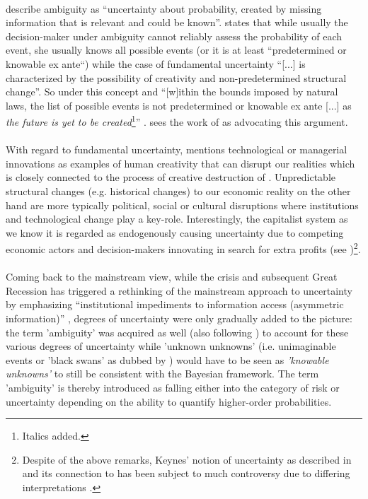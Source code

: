 \documentclass[a4paper,12pt,oneside,pointednumbers,bibtotoc,bigheadings,liststotoc]{scrbook}
\begin{document}
\\
\citet[p. 330]{camererandweber:92} describe ambiguity as ``uncertainty about probability, created by missing information that is relevant and could be known''. \citet[p. 623]{dequech:14} states that while usually the decision-maker under ambiguity cannot reliably assess the probability of each event, she usually knows all possible events (or it is at least ``predetermined or knowable ex ante``) while the case of fundamental uncertainty ``[...] is characterized by the possibility of creativity and non-predetermined structural change''. So under this concept and ``[w]ithin the bounds imposed by natural laws, the list of possible events is not predetermined or knowable ex ante [...] as \textit{the future is yet to be created}\footnote{Italics added.}'' \citep[p. 623]{dequech:14}. \citet{dequesh:00} sees the work of \citet{shackle:72} as advocating this argument.\\
\\
With regard to fundamental uncertainty, \citet{dequesh:00} mentions technological or managerial innovations as examples of human creativity that can disrupt our realities which is closely connected to the process of creative destruction of \citet{schumpeter:42}. Unpredictable structural changes (e.g. historical changes) to our economic reality on the other hand are more typically political, social or cultural disruptions where institutions and technological change play a key-role. Interestingly, the capitalist system as we know it is regarded as endogenously causing uncertainty due to competing economic actors and decision-makers innovating in search for extra profits (see \citealp{kregel:87})\footnote{Despite of the above remarks, Keynes' notion of uncertainty as described in \citet{keynes:21} and its connection to \citet{keynes:37} has been subject to much controversy due to differing interpretations \citep{dequesh:00}.}.\\
\\
Coming back to the mainstream view, while the crisis and subsequent Great Recession has triggered a rethinking of the mainstream approach to uncertainty by emphasizing ``institutional impediments to information access (asymmetric information)'' \citep[p. 8]{dow:16}, degrees of uncertainty were only gradually added to the picture: the term 'ambiguity' was acquired as well (also following \citealp[p. 330]{camererandweber:92}) to account for these various degrees of uncertainty while 'unknown unknowns' (i.e. unimaginable events or 'black swans' as dubbed by \citealp{taleb:08}) would have to be seen as \textit{'knowable unknowns'} to still be consistent with the Bayesian framework. The term 'ambiguity' is thereby introduced as falling either into the category of risk or uncertainty depending on the ability to quantify higher-order probabilities.
\end{document}
